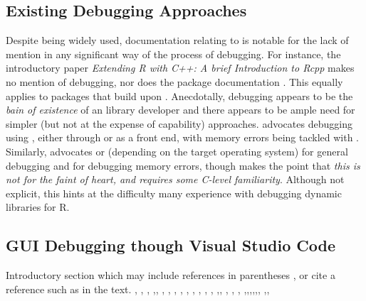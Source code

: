 \hypertarget{exitising-debugging-approaches}{%
\subsection{Existing Debugging Approaches}
\label{exitising-debugging-approaches}}
Despite being widely used, documentation relating to  is notable for the lack of mention in any significant way of the process of debugging. For instance, the 
introductory paper \emph{Extending R with C++: A brief Introduction to Rcpp} \citep{RcppIntro} makes no mention of debugging, nor does the package documentation \citep{Rcpp}. 
This equally applies to packages that build upon . Anecdotally, debugging appears to be the \emph{bain of existence} of an  library developer and 
there appears to be ample need for simpler (but not at the expense of capability) approaches. \citep{DebuggingRandCcodeinR} advocates debugging using 
\citep{GDB}, either through  or \citep{DDD} as a  front end, with memory errors being tackled with . Similarly, 
\citep{DebuggingC_Cpp} advocates  or  \citep{LLDB} (depending on the target operating system) for general debugging and  for debugging memory 
errors, though makes the point that \emph{this is not for the faint of heart, and requires some C-level familiarity}. Although not explicit, this hints at the difficulty
many experience with debugging dynamic libraries for R. 

\hypertarget{visual-studio-code-extensions}{%
\subsection{GUI Debugging though Visual Studio Code}
\label{visual-studio-code-extensions}}


Introductory section which may include references in parentheses
\citep{R}, or cite a reference such as \citet{R} in the text. \citep{Rcpp}, \citep{RcppEigen}, \citep{TMB}, \citep{Rextensions}
\citep{DebuggingC_Cpp},\citep{DebuggingRandCcodeinR}, \citep{CodeLLDB-manual}, \citep{CodeLLDB}, \citep{VSCodeTipsTricks}, 
\citep{VSCodeDownload}, \citep{VSCodeCCppExt}, \citep{VSCodeCCpp}, \citep{GDB}, \citep{ModernDebugging}, \citep{DDD},
\citep{ImprovingCppDebug},\citep{UsingRtools}, \citep{RcppIntro}, \citep{ihaka:1996}, \citep{RcppEigenLA},
\citep{TMBlaplace},\citep{DotC},\citep{DotC2},\citep{deSolve},\citep{Routines},\citep{LLDB},
\citep{Xcode},\citep{debug-visualize-ext},\citep{debug-visualize}

